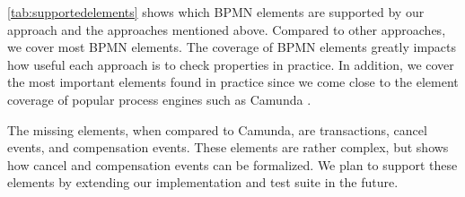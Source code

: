 \documentclass{lmcs} %
\begin{document}
\autoref{tab:supportedelements} shows which BPMN elements are supported by our approach and the approaches mentioned above.
Compared to other approaches, we cover most BPMN elements.
The coverage of BPMN elements greatly impacts how useful each approach is to check properties in practice.
In addition, we cover the most important elements found in practice since we come close to the element coverage of popular process engines such as Camunda \cite{camundaservicesgmbhBPMNImplementationReference2023}.

The missing elements, when compared to Camunda, are transactions, cancel events, and compensation events.
These elements are rather complex, but \cite{vangorpVisualTokenbasedFormalization2013} shows how cancel and compensation events can be formalized.
We plan to support these elements by extending our implementation and test suite in the future.
\end{document}
